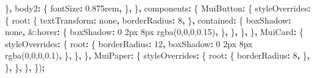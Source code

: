 \documentclass[
]{article}
\newenvironment{Shaded}{\begin{snugshade}}{\end{snugshade}}
\newcommand{\DecValTok}[1]{\textcolor[rgb]{0.00,0.00,0.81}{#1}}
\newcommand{\NormalTok}[1]{#1}
\newcommand{\OperatorTok}[1]{\textcolor[rgb]{0.81,0.36,0.00}{\textbf{#1}}}
\newcommand{\StringTok}[1]{\textcolor[rgb]{0.31,0.60,0.02}{#1}}
\begin{document}
\begin{Shaded}
\begin{Highlighting}[]
\NormalTok{    \}}\OperatorTok{,}
\NormalTok{    body2}\OperatorTok{:}\NormalTok{ \{}
\NormalTok{      fontSize}\OperatorTok{:} \StringTok{\textquotesingle{}0.875rem\textquotesingle{}}\OperatorTok{,}
\NormalTok{    \}}\OperatorTok{,}
\NormalTok{  \}}\OperatorTok{,}
\NormalTok{  components}\OperatorTok{:}\NormalTok{ \{}
\NormalTok{    MuiButton}\OperatorTok{:}\NormalTok{ \{}
\NormalTok{      styleOverrides}\OperatorTok{:}\NormalTok{ \{}
\NormalTok{        root}\OperatorTok{:}\NormalTok{ \{}
\NormalTok{          textTransform}\OperatorTok{:} \StringTok{\textquotesingle{}none\textquotesingle{}}\OperatorTok{,}
\NormalTok{          borderRadius}\OperatorTok{:} \DecValTok{8}\OperatorTok{,}
\NormalTok{        \}}\OperatorTok{,}
\NormalTok{        contained}\OperatorTok{:}\NormalTok{ \{}
\NormalTok{          boxShadow}\OperatorTok{:} \StringTok{\textquotesingle{}none\textquotesingle{}}\OperatorTok{,}
          \StringTok{\textquotesingle{}\&:hover\textquotesingle{}}\OperatorTok{:}\NormalTok{ \{}
\NormalTok{            boxShadow}\OperatorTok{:} \StringTok{\textquotesingle{}0 2px 8px rgba(0,0,0,0.15)\textquotesingle{}}\OperatorTok{,}
\NormalTok{          \}}\OperatorTok{,}
\NormalTok{        \}}\OperatorTok{,}
\NormalTok{      \}}\OperatorTok{,}
\NormalTok{    \}}\OperatorTok{,}
\NormalTok{    MuiCard}\OperatorTok{:}\NormalTok{ \{}
\NormalTok{      styleOverrides}\OperatorTok{:}\NormalTok{ \{}
\NormalTok{        root}\OperatorTok{:}\NormalTok{ \{}
\NormalTok{          borderRadius}\OperatorTok{:} \DecValTok{12}\OperatorTok{,}
\NormalTok{          boxShadow}\OperatorTok{:} \StringTok{\textquotesingle{}0 2px 8px rgba(0,0,0,0.1)\textquotesingle{}}\OperatorTok{,}
\NormalTok{        \}}\OperatorTok{,}
\NormalTok{      \}}\OperatorTok{,}
\NormalTok{    \}}\OperatorTok{,}
\NormalTok{    MuiPaper}\OperatorTok{:}\NormalTok{ \{}
\NormalTok{      styleOverrides}\OperatorTok{:}\NormalTok{ \{}
\NormalTok{        root}\OperatorTok{:}\NormalTok{ \{}
\NormalTok{          borderRadius}\OperatorTok{:} \DecValTok{8}\OperatorTok{,}
\NormalTok{        \}}\OperatorTok{,}
\NormalTok{      \}}\OperatorTok{,}
\NormalTok{    \}}\OperatorTok{,}
\NormalTok{  \}}\OperatorTok{,}
\NormalTok{\})}\OperatorTok{;}
\end{Highlighting}
\end{Shaded}
\end{document}

